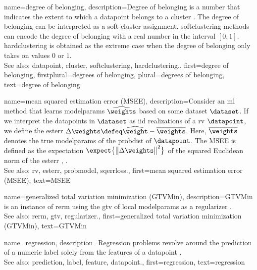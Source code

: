 {name={degree of belonging}, 
	description={Degree of belonging is a number that indicates the extent to which a \gls{datapoint} 
		belongs to a \gls{cluster} \cite[Ch. 8]{MLBasics}. The degree of belonging can be 
		interpreted as a soft \gls{cluster} assignment. \Gls{softclustering} methods can 
		encode the degree of belonging with a real number in the interval $[0,1]$. 
		\Gls{hardclustering} is obtained as the extreme case when the degree of belonging 
		only takes on values $0$ or $1$.
					\\ 
		See also: \gls{datapoint}, \gls{cluster}, \gls{softclustering}, \gls{hardclustering}.}, 
	first={degree of belonging},
	firstplural={degrees of belonging},
	plural={degrees of belonging},
	text={degree of belonging} 
}

{name={mean squared estimation error (MSEE)},
	description={Consider an \gls{ml} method that 
		learns \glspl{modelparam} $\widehat{\weights}$ based on some \gls{dataset} $\dataset$. 
		If we interpret the \glspl{datapoint} in $\dataset$ as \gls{iid} \glspl{realization} of a \gls{rv} $\datapoint$, 
		we define the \gls{esterr} $\Delta \weights \defeq \widehat{\weight} - \overline{\weights}$. 
		Here, $\overline{\weights}$ denotes the true \glspl{modelparam} of the \gls{probdist} 
		of $\datapoint$. The MSEE is 
		defined as the \gls{expectation} $\expect \big\{ \big\| \Delta \weights \big\|^{2} \big\}$ of the 
		squared Euclidean \gls{norm} of the \gls{esterr} \cite{LC}, \cite{kay}.
					\\ 
		See also: \gls{rv}, \gls{esterr}, \gls{probmodel}, \gls{sqerrloss}.},
	first={mean squared estimation error (MSEE)},
	text={MSEE} 
}

{name={generalized total variation minimization (GTVMin)},
	description={GTVMin is an instance of \gls{rerm} 
		using the \gls{gtv} of local \glspl{modelparam} as a \gls{regularizer} \cite{ClusteredFLTVMinTSP}.
					\\ 
		See also: \gls{rerm}, \gls{gtv}, \gls{regularizer}.},
	first={generalized total variation minimization (GTVMin)},
	text={GTVMin} 
}

{name={regression},
	description={Regression problems revolve around the 
		\gls{prediction} of a numeric \gls{label} solely from the \glspl{feature} of a \gls{datapoint} \cite[Ch. 2]{MLBasics}.
					\\ 
		See also: \gls{prediction}, \gls{label}, \gls{feature}, \gls{datapoint}.},
	first={regression},
	text={regression} 
}

